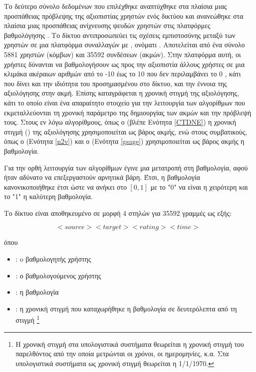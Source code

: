 Το δεύτερο σύνολο δεδομένων που επιλέχθηκε αναπτύχθηκε στα πλαίσια μιας προσπάθειας πρόβλεψης
της αξιοπιστίας χρηστών ενός δικτύου \cite{kumar2016edge} και ανανεώθηκε στα πλαίσια μιας 
προσπάθειας ανίχνευσης ψευδών χρηστών στις πλατφόρμες βαθμολόγησης \cite{kumar2018rev2}.
Το δίκτυο αντιπροσωπεύει τις σχέσεις εμπιστοσύνης μεταξύ των χρηστών σε μια πλατφόρμα 
συναλλαγών με , ονόματι . Αποτελείται από ένα σύνολο 5881 χρηστών
(κόμβων) και 35592 συνδέσεων (ακμών). Στην πλατφόρμα αυτή, οι χρήστες δύνανται
να βαθμολογήσουν ως προς την αξιοπιστία άλλους χρήστες σε μια κλιμάκα ακέραιων αριθμών από το   -10 έως το 10  που δεν περιλαμβάνει το 0 , κάτι που δίνει και την ιδιότητα του προσημασμένου στο δίκτυο, και την έννοια της
αξιολόγησης στην ακμή. Επίσης καταγράφεται η
χρονική στιγμή της αξιολόγησης, κάτι το οποίο είναι ένα απαραίτητο στοιχείο για την λειτουργία
των αλγορίθμων που εκμεταλλεύονται τη χρονική παράμετρο της δημιουργίας των ακμών και την
πρόβλεψή τους. Στους εν λόγω αλγορίθμους, όπως ο 
(βλέπε Ενότητα \ref{CTDNE}) η χρονική στιγμή () της αξιολόγησης χρησιμοποιείται ως βάρος
ακμής, ενώ στους συμβατικούς, όπως ο  (Ενότητα \ref{n2v}) και ο  
(Ενότητα \ref{gsage}) χρησιμοποιείται ως βάρος ακμής η βαθμολογία. 

Για την ορθή λειτουργία των αλγορίθμων έγινε μια μετατροπή στη βαθμολογία, αφού ήταν αδύνατο 
να επεξεργαστούν αρνητικά βάρη. Έτσι, η βαθμολογία
κανονικοποιήθηκε έτσι ώστε να ανήκει στο \( [0,1]\) με το "0" να είναι η χειρότερη και το "1" η καλύτερη
βαθμολογία.

Το δίκτυο είναι αποθηκευμένο σε μορφή 4 στηλών για 35592 γραμμές ως εξής: 

\begin{equation*}
    <source><target><rating><time>
\end{equation*}

όπου \begin{itemize}
    \item {}: o βαθμολογητής χρήστης
    \item {}: ο βαθμολογούμενος χρήστης
    \item {}: η βαθμολογία
    \item {}: η χρονική στιγμή που καταχωρήθηκε η βαθμολογία σε δευτερόλεπτα από τη 
    στιγμή  \footnote{Η χρονική στιγμή  στα υπολογιστικά συστήματα
    θεωρείται η χρονική στιγμή του παρελθόντος από την οποία μετρώνται οι χρόνοι,
    οι ημερομηνίες, κ.α. Στα υπολογιστικά συστήματα  ως χρονική στιγμή
     θεωρείται η 1/1/1970.}
\end{itemize}

